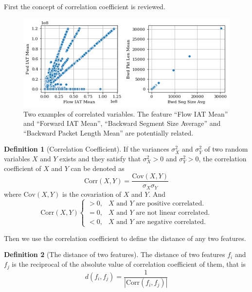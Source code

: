 \documentclass{ieeeaccess}
\theoremstyle{definition}
\newtheorem{defn}{Definition}
\begin{document}
First the concept of correlation coefficient is reviewed.

\begin{figure}
    \centering
    \includegraphics[scale=0.5]{fig/scatter-correlated-variables.png}
    \caption{Two examples of correlated variables. The feature ``Flow IAT Mean'' and ``Forward IAT Mean'', ``Backward Segment Size Average'' and ``Backward Packet Length Mean'' are potentially related. }
    \label{fig:correlated-variables}
\end{figure}

\begin{defn}[Correlation Coefficient]
    If the variances $\sigma^2_X$ and $\sigma_Y^2$ of two random variables $X$ and $Y$ exists and they satisfy that $\sigma^2_X > 0$ and $\sigma^2_Y > 0$, the correlation coefficient of $X$ and $Y$ can be denoted as
\begin{equation}
    \text{Corr}(X, Y) = \frac{\text{Cov}(X, Y)}{\sigma_X \sigma_Y}
\end{equation}
where $\text{Cov}(X, Y)$ is the covariation of $X$ and $Y$. And
$$\text{Corr}(X, Y) \begin{cases}
    > 0, & X \text{ and } Y \text{ are positive correlated.}\\
    = 0, & X \text{ and } Y \text{ are not linear correlated.} \\
    < 0, & X \text{ and } Y \text{ are negative correlated.}
\end{cases}$$
\end{defn}

Then we use the correlation coefficient to define the distance of any two features.

\begin{defn}[The distance of two features]
\label{def:distance}
The distance of two features $f_i$ and $f_j$ is the reciprocal of the absolute value of correlation coefficient of them, that is
\begin{equation}
    \label{eq:distance}
    d(f_i, f_j) = \frac{1}{|\text{Corr}(f_i, f_j)|}
\end{equation}
\end{defn}
\end{document}

